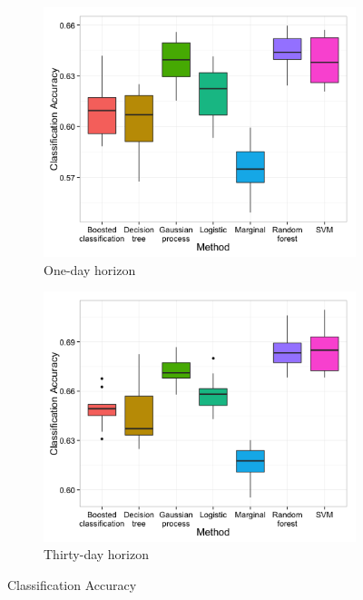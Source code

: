 \documentclass[twocolumn]{article}
\begin{document}
\begin{figure}
    \centering
    \begin{subfigure}{0.45\textwidth}
        \centering
        \includegraphics[width=\linewidth]{figures/class-performance-sample-5000-OneDayHorizon.png}
        \caption{One-day horizon}
    \end{subfigure}
    \begin{subfigure}{0.45\textwidth}
        \centering
        \includegraphics[width=\linewidth]{figures/class-performance-sample-5000-OneMonthHorizon.png}
        \caption{Thirty-day horizon}
    \end{subfigure}
    \caption{Classification Accuracy}
    \label{fig:classification-accuracy}
\end{figure}
\end{document}
